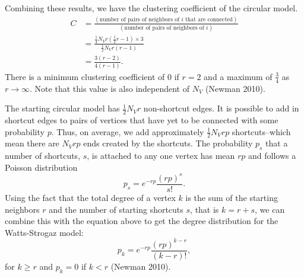 \documentclass[12pt,twoside]{amherstthesis}
\begin{document}
  Combining these results, we have the clustering coefficient of the
  circular model. \[
  \begin{aligned}
  C &= \frac {(\text{number of pairs of neighbors of } i \text{ that are connected})} {(\text{number of pairs of neighbors of } i)} \\
  &= \frac {\frac {1} {4} N_{V} r \left(\frac {1} {2} r - 1 \right) \times 3} {\frac {1} {2} N_{V} r(r - 1)} \\
  &= \frac {3(r - 2)} {4(r - 1)}.
  \end{aligned}
  \] There is a minimum clustering coefficient of \(0\) if \(r = 2\) and a
  maximum of \(\frac {3} {4}\) as \(r \to \infty\). Note that this value
  is also independent of \(N_{V}\) (Newman 2010).
  
  The starting circular model has \(\frac {1} {2} N_{V}r\) non-shortcut
  edges. It is possible to add in shortcut edges to pairs of vertices that
  have yet to be connected with some probability \(p\). Thus, on average,
  we add approximately \(\frac {1} {2} N_{V}rp\) shortcuts--which mean
  there are \(N_{V}rp\) ends created by the shortcuts. The probability
  \(p_{s}\) that a number of shortcuts, \(s\), is attached to any one
  vertex has mean \(rp\) and follows a Poisson distribution
  \[p_{s} = e^{-rp} \frac {(rp)^{s}} {s!}.\] Using the fact that the total
  degree of a vertex \(k\) is the sum of the starting neighbors \(r\) and
  the number of starting shortcuts \(s\), that is \(k = r + s\), we can
  combine this with the equation above to get the degree distribution for
  the Watts-Strogaz model:
  \[p_{k} = e^{-rp} \frac {(rp)^{k - r}} {(k - r)!},\] for \(k \geq r\)
  and \(p_{k} = 0\) if \(k < r\) (Newman 2010).
  
\end{document}
